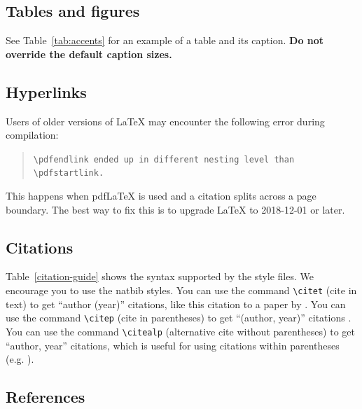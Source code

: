 \documentclass[11pt]{article}
\begin{document}
\subsection{Tables and figures}

See Table~\ref{tab:accents} for an example of a table and its caption.
\textbf{Do not override the default caption sizes.}

\subsection{Hyperlinks}

Users of older versions of \LaTeX{} may encounter the following error during compilation: 
\begin{quote}
\tt\verb|\pdfendlink| ended up in different nesting level than \verb|\pdfstartlink|.
\end{quote}
This happens when pdf\LaTeX{} is used and a citation splits across a page boundary. The best way to fix this is to upgrade \LaTeX{} to 2018-12-01 or later.

\subsection{Citations}



Table~\ref{citation-guide} shows the syntax supported by the style files.
We encourage you to use the natbib styles.
You can use the command \verb|\citet| (cite in text) to get ``author (year)'' citations, like this citation to a paper by \citet{Gusfield:97}.
You can use the command \verb|\citep| (cite in parentheses) to get ``(author, year)'' citations \citep{Gusfield:97}.
You can use the command \verb|\citealp| (alternative cite without parentheses) to get ``author, year'' citations, which is useful for using citations within parentheses (e.g. \citealp{Gusfield:97}).

\subsection{References}

\nocite{Ando2005,augenstein-etal-2016-stance,andrew2007scalable,rasooli-tetrault-2015,goodman-etal-2016-noise,harper-2014-learning}
\end{document}

